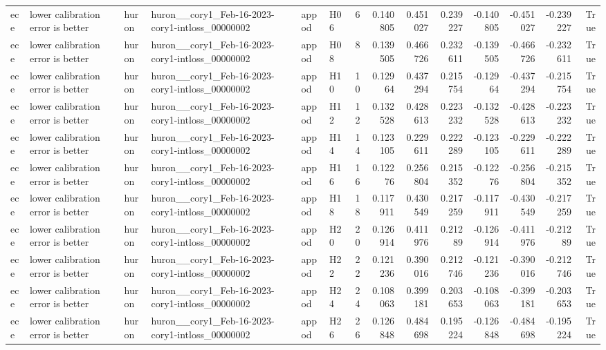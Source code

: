 \begin{longtable}{llllllrrrrrrrr}
ece & lower calibration error is better & huron & huron\_\_cory1\_Feb-16-2023-cory1-intloss\_00000002 & appod & H06 & 6 & 0.140805 & 0.451027 & 0.239227 & -0.140805 & -0.451027 & -0.239227 & True \\
ece & lower calibration error is better & huron & huron\_\_cory1\_Feb-16-2023-cory1-intloss\_00000002 & appod & H08 & 8 & 0.139505 & 0.466726 & 0.232611 & -0.139505 & -0.466726 & -0.232611 & True \\
ece & lower calibration error is better & huron & huron\_\_cory1\_Feb-16-2023-cory1-intloss\_00000002 & appod & H10 & 10 & 0.12964 & 0.437294 & 0.215754 & -0.12964 & -0.437294 & -0.215754 & True \\
ece & lower calibration error is better & huron & huron\_\_cory1\_Feb-16-2023-cory1-intloss\_00000002 & appod & H12 & 12 & 0.132528 & 0.428613 & 0.223232 & -0.132528 & -0.428613 & -0.223232 & True \\
ece & lower calibration error is better & huron & huron\_\_cory1\_Feb-16-2023-cory1-intloss\_00000002 & appod & H14 & 14 & 0.123105 & 0.229611 & 0.222289 & -0.123105 & -0.229611 & -0.222289 & True \\
ece & lower calibration error is better & huron & huron\_\_cory1\_Feb-16-2023-cory1-intloss\_00000002 & appod & H16 & 16 & 0.12276 & 0.256804 & 0.215352 & -0.12276 & -0.256804 & -0.215352 & True \\
ece & lower calibration error is better & huron & huron\_\_cory1\_Feb-16-2023-cory1-intloss\_00000002 & appod & H18 & 18 & 0.117911 & 0.430549 & 0.217259 & -0.117911 & -0.430549 & -0.217259 & True \\
ece & lower calibration error is better & huron & huron\_\_cory1\_Feb-16-2023-cory1-intloss\_00000002 & appod & H20 & 20 & 0.126914 & 0.411976 & 0.21289 & -0.126914 & -0.411976 & -0.21289 & True \\
ece & lower calibration error is better & huron & huron\_\_cory1\_Feb-16-2023-cory1-intloss\_00000002 & appod & H22 & 22 & 0.121236 & 0.390016 & 0.212746 & -0.121236 & -0.390016 & -0.212746 & True \\
ece & lower calibration error is better & huron & huron\_\_cory1\_Feb-16-2023-cory1-intloss\_00000002 & appod & H24 & 24 & 0.108063 & 0.399181 & 0.203653 & -0.108063 & -0.399181 & -0.203653 & True \\
ece & lower calibration error is better & huron & huron\_\_cory1\_Feb-16-2023-cory1-intloss\_00000002 & appod & H26 & 26 & 0.126848 & 0.484698 & 0.195224 & -0.126848 & -0.484698 & -0.195224 & True \\

\end{longtable}
